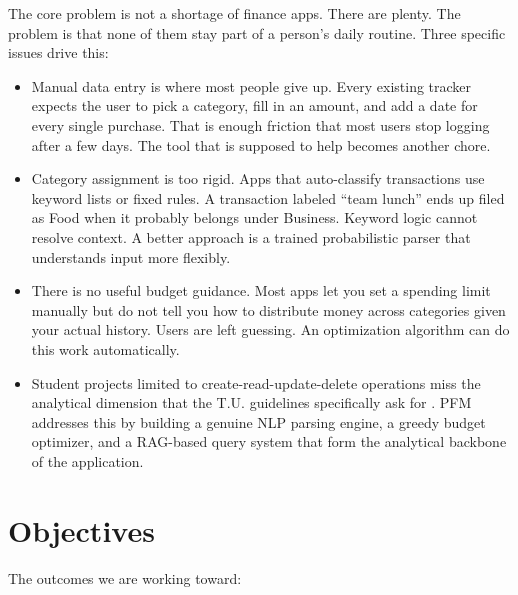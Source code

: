 \documentclass[12pt, a4paper]{article}
\begin{document}
The core problem is not a shortage of finance apps. There are plenty. The problem is that none of them stay part of a person's daily routine. Three specific issues drive this:

\begin{itemize}
    \item Manual data entry is where most people give up. Every existing tracker expects the user to pick a category, fill in an amount, and add a date for every single purchase. That is enough friction that most users stop logging after a few days. The tool that is supposed to help becomes another chore.

    \item Category assignment is too rigid. Apps that auto-classify transactions use keyword lists or fixed rules. A transaction labeled ``team lunch'' ends up filed as Food when it probably belongs under Business. Keyword logic cannot resolve context. A better approach is a trained probabilistic parser that understands input more flexibly.

    \item There is no useful budget guidance. Most apps let you set a spending limit manually but do not tell you how to distribute money across categories given your actual history. Users are left guessing. An optimization algorithm can do this work automatically.

    \item Student projects limited to create-read-update-delete operations miss the analytical dimension that the T.U. guidelines specifically ask for \cite{tuguide}. PFM addresses this by building a genuine NLP parsing engine, a greedy budget optimizer, and a RAG-based query system that form the analytical backbone of the application.
\end{itemize}

\newpage
\section{Objectives}

The outcomes we are working toward:
\end{document}
